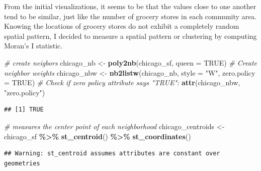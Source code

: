 \documentclass[
]{article}
\newenvironment{Shaded}{\begin{snugshade}}{\end{snugshade}}
\newcommand{\AttributeTok}[1]{\textcolor[rgb]{0.13,0.29,0.53}{#1}}
\newcommand{\CommentTok}[1]{\textcolor[rgb]{0.56,0.35,0.01}{\textit{#1}}}
\newcommand{\ConstantTok}[1]{\textcolor[rgb]{0.56,0.35,0.01}{#1}}
\newcommand{\FunctionTok}[1]{\textcolor[rgb]{0.13,0.29,0.53}{\textbf{#1}}}
\newcommand{\NormalTok}[1]{#1}
\newcommand{\OtherTok}[1]{\textcolor[rgb]{0.56,0.35,0.01}{#1}}
\newcommand{\SpecialCharTok}[1]{\textcolor[rgb]{0.81,0.36,0.00}{\textbf{#1}}}
\newcommand{\StringTok}[1]{\textcolor[rgb]{0.31,0.60,0.02}{#1}}
\begin{document}
From the initial visualizations, it seems to be that the values close to
one another tend to be similar, just like the number of grocery stores
in each community area. Knowing the locations of grocery stores do not
exhibit a completely random spatial pattern, I decided to measure a
spatial pattern or clustering by computing Moran's I statistic.

\begin{Shaded}
\begin{Highlighting}[]
\CommentTok{\# create neigbors}
\NormalTok{chicago\_nb }\OtherTok{\textless{}{-}} \FunctionTok{poly2nb}\NormalTok{(chicago\_sf, }\AttributeTok{queen =} \ConstantTok{TRUE}\NormalTok{)}
\CommentTok{\# Create neighbor weights}
\NormalTok{chicago\_nbw }\OtherTok{\textless{}{-}} \FunctionTok{nb2listw}\NormalTok{(chicago\_nb, }\AttributeTok{style =} \StringTok{"W"}\NormalTok{, }\AttributeTok{zero.policy =} \ConstantTok{TRUE}\NormalTok{)}
\CommentTok{\# Check if zero policy attribute says "TRUE": }
\FunctionTok{attr}\NormalTok{(chicago\_nbw, }\StringTok{"zero.policy"}\NormalTok{)}
\end{Highlighting}
\end{Shaded}

\begin{verbatim}
## [1] TRUE
\end{verbatim}

\begin{Shaded}
\begin{Highlighting}[]
\CommentTok{\# measures the center point of each neighborhood}
\NormalTok{chicago\_centroids }\OtherTok{\textless{}{-}}\NormalTok{ chicago\_sf }\SpecialCharTok{\%\textgreater{}\%}
  \FunctionTok{st\_centroid}\NormalTok{() }\SpecialCharTok{\%\textgreater{}\%}
  \FunctionTok{st\_coordinates}\NormalTok{()}
\end{Highlighting}
\end{Shaded}

\begin{verbatim}
## Warning: st_centroid assumes attributes are constant over geometries
\end{verbatim}
\end{document}
